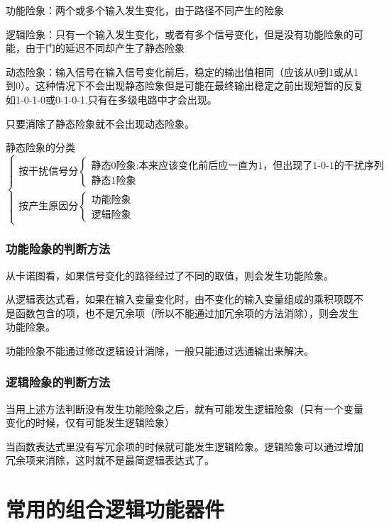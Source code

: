 \documentclass{ctexart}
\begin{document}
功能险象：两个或多个输入发生变化，由于路径不同产生的险象

逻辑险象：只有一个输入发生变化，或者有多个信号变化，但是没有功能险象的可能，由于门的延迟不同却产生了静态险象

动态险象：输入信号在输入信号变化前后，稳定的输出值相同（应该从0到1或从1到0）。这种情况下不会出现静态险象但是可能在最终输出稳定之前出现短暂的反复如1-0-1-0或0-1-0-1.只有在多级电路中才会出现。

只要消除了静态险象就不会出现动态险象。

静态险象的分类
\begin{equation}
    \begin{cases}
        \text{按干扰信号分}
        \begin{cases}
            \text{静态0险象:本来应该变化前后应一直为1，但出现了1-0-1的干扰序列}\\
            \text{静态1险象}
        \end{cases}\\
        \text{按产生原因分}
        \begin{cases}
            \text{功能险象}\\
            \text{逻辑险象}
        \end{cases}

    \end{cases}
\end{equation}
\subsubsection{功能险象的判断方法}
从卡诺图看，如果信号变化的路径经过了不同的取值，则会发生功能险象。

从逻辑表达式看，如果在输入变量变化时，由不变化的输入变量组成的乘积项既不是函数包含的项，也不是冗余项（所以不能通过加冗余项的方法消除），则会发生功能险象。

功能险象不能通过修改逻辑设计消除，一般只能通过选通输出来解决。
{\color{red}{功能险象仅在两个及以上变量发生变化时才会发生}}
\subsubsection{逻辑险象的判断方法}
当用上述方法判断没有发生功能险象之后，就有可能发生逻辑险象（只有一个变量变化的时候，仅有可能发生逻辑险象）

当函数表达式里没有写冗余项的时候就可能发生逻辑险象。逻辑险象可以通过增加冗余项来消除，这时就不是最简逻辑表达式了。
\section{常用的组合逻辑功能器件}
\end{document}
